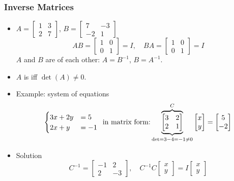\documentclass[8pt]{beamer}
\newcommand{\myemph}[1]{{\color{blue}{#1}}}
\begin{document}
\begin{frame}
  \frametitle{Inverse Matrices}
  \begin{itemize}
  \item $A =
    \begin{bmatrix}
      1 & 3\\ 2 & 7
    \end{bmatrix}
    $,
    $B =
    \begin{bmatrix}
    7 & -3 \\
    -2 & 1
    \end{bmatrix}
    $
    $$
    AB =
    \begin{bmatrix}
      1 & 0 \\0 & 1
    \end{bmatrix} = I,\quad BA =
    \begin{bmatrix}
      1 & 0\\
      0 & 1
    \end{bmatrix}
    = I
    $$
    $A$ and $B$ are \myemph{inverse} of each other: $A = B^{-1}$, $B = A^{-1}$.
  \item $A$ is \myemph{invertible} iff $\det(A) \not= 0$.
  \item Example: system of equations
    $$
    \begin{cases}
      3x + 2y &=5\\
      2x + y &=-1
    \end{cases}\,\text{ in matrix form:}\,
    \udesc{\det=3-4 = -1\not=0}{\odesc{C}{
    \begin{bmatrix}
      3 & 2\\ 2 & 1
    \end{bmatrix}}}
    \begin{bmatrix}
      x \\ y
    \end{bmatrix}=
    \begin{bmatrix}
      5 \\ -2
    \end{bmatrix}
    $$
  \item Solution
    $$
    C^{-1} =
    \begin{bmatrix}
      -1 & 2\\2 & -3
    \end{bmatrix},\quad
    C^{-1}C
    \begin{bmatrix}
      x\\y  
    \end{bmatrix} = 
    I
    \begin{bmatrix}
      x\\y

\end{bmatrix}$$
\end{itemize}
\end{frame}
\end{document}

